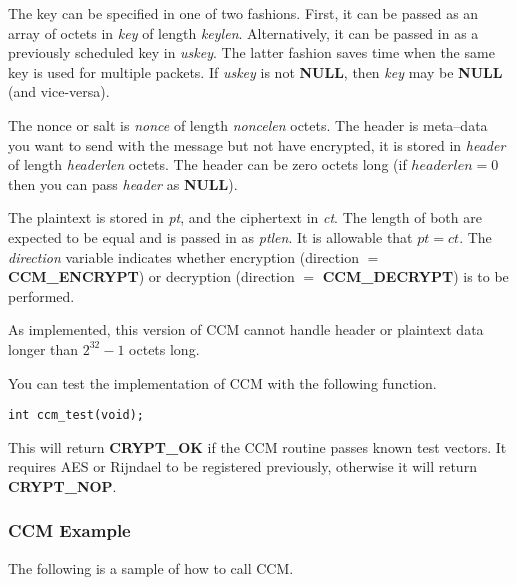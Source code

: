 \documentclass[synpaper]{book}
\begin{document}
The key can be specified in one of two fashions.  First, it can be passed as an array of octets in \textit{key} of length \textit{keylen}.  Alternatively,
it can be passed in as a previously scheduled key in \textit{uskey}.  The latter fashion saves time when the same key is used for multiple packets.  If
\textit{uskey} is not \textbf{NULL}, then \textit{key} may be \textbf{NULL} (and vice-versa). 

The nonce or salt is \textit{nonce} of length \textit{noncelen} octets.  The header is meta--data you want to send with the message but not have 
encrypted, it is stored in \textit{header} of length \textit{headerlen} octets.  The header can be zero octets long (if $headerlen = 0$ then 
you can pass \textit{header} as \textbf{NULL}).  

The plaintext is stored in \textit{pt}, and the ciphertext in \textit{ct}.  The length of both are expected to be equal and is passed in as \textit{ptlen}.  It is
allowable that $pt = ct$.  The \textit{direction} variable indicates whether encryption (direction $=$ \textbf{CCM\_ENCRYPT}) or 
decryption (direction $=$ \textbf{CCM\_DECRYPT}) is to be performed.

As implemented, this version of CCM cannot handle header or plaintext data longer than $2^{32} - 1$ octets long.  

You can test the implementation of CCM with the following function.

\begin{verbatim}
int ccm_test(void);
\end{verbatim}

This will return \textbf{CRYPT\_OK} if the CCM routine passes known test vectors.  It requires AES or Rijndael to be registered previously, otherwise it will
return \textbf{CRYPT\_NOP}.

\subsubsection{CCM Example}
The following is a sample of how to call CCM.
\end{document}
